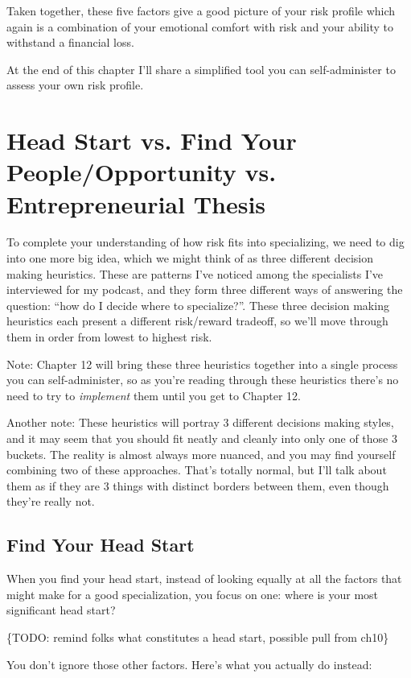 Taken together, these five factors give a good picture of your risk profile which again is a combination of your emotional comfort with risk and your ability to withstand a financial loss.

At the end of this chapter I'll share a simplified tool you can self-administer to assess your own risk profile.

\section{Head Start vs. Find Your People/Opportunity vs. Entrepreneurial Thesis}

To complete your understanding of how risk fits into specializing, we need to dig into one more big idea, which we might think of as three different decision making heuristics. These are patterns I've noticed among the specialists I've interviewed for my podcast, and they form three different ways of answering the question: ``how do I decide where to specialize?''. These three decision making heuristics each present a different risk/reward tradeoff, so we'll move through them in order from lowest to highest risk.

Note: Chapter 12 will bring these three heuristics together into a single process you can self-administer, so as you're reading through these heuristics there's no need to try to \emph{implement} them until you get to Chapter 12.

Another note: These heuristics will portray 3 different decisions making styles, and it may seem that you should fit neatly and cleanly into only one of those 3 buckets. The reality is almost always more nuanced, and you may find yourself combining two of these approaches. That's totally normal, but I'll talk about them as if they are 3 things with distinct borders between them, even though they're really not.

\subsection{\textbf{Find Your Head Start}}

When you find your head start, instead of looking equally at all the factors that might make for a good specialization, you focus on one: where is your most significant head start?

\{TODO: remind folks what constitutes a head start, possible pull from ch10\}

You don't ignore those other factors. Here's what you actually do instead:

